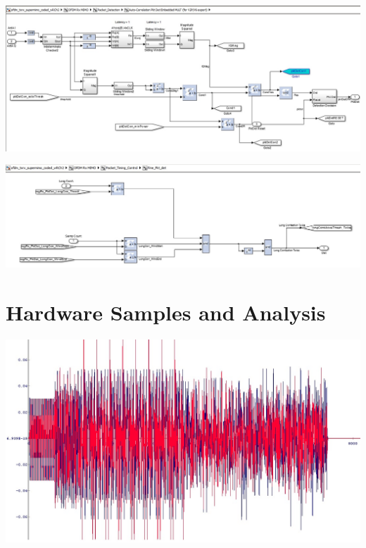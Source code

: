 \begin{center}
\includegraphics[width=\textwidth]{content/fig/autocorrblock.JPG}
\label{autocorrblock}
\end{center}

\begin{center}
\includegraphics[width=\textwidth]{content/fig/fine_packetDetect.JPG}
\label{autocorrblock}
\end{center}

\section{Hardware Samples and Analysis}
\label{hw_samples}

\begin{center}
\includegraphics[width=\textwidth]{content/fig/ofdmframe_chipscope.JPG}
\label{ofdmframe_chipscope}
\end{center}

